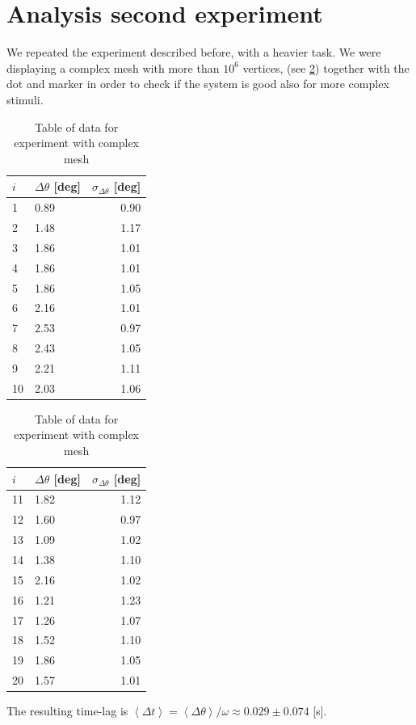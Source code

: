 \documentclass[a4paper]{article}  %
\begin{document}
\section{Analysis second experiment}
We repeated the experiment described before, with a heavier task. We were displaying a complex mesh with more than $10^6$ vertices, (see \ref{tab:table_exp2}) together with the dot and marker in order to check if the system is good also for more complex stimuli.

\begin{table}[htb!]\label{tab:table_exp2}
\centering
\begin{tabular}{|l|l|r|} \hline
$i$ & $\Delta \theta$ [deg] & $\sigma_{\Delta \theta}$ [deg]\\
\hline 
1 & 0.89 & 0.90 \\ \hline
2 & 1.48 & 1.17 \\ \hline
3 & 1.86 & 1.01 \\ \hline
4 & 1.86 & 1.01 \\ \hline
5 & 1.86 & 1.05 \\ \hline
6 & 2.16 & 1.01 \\ \hline
7 & 2.53 & 0.97 \\ \hline
8 & 2.43 & 1.05 \\ \hline
9 & 2.21 & 1.11 \\ \hline
10 & 2.03 & 1.06 \\
\hline
\end{tabular}
\begin{tabular}{|l|l|r|} \hline
$i$ & $\Delta \theta$ [deg] & $\sigma_{\Delta \theta}$ [deg]\\
\hline 
11 & 1.82 & 1.12 \\ \hline
12 & 1.60 & 0.97 \\ \hline
13 & 1.09 & 1.02 \\ \hline
14 & 1.38 & 1.10 \\ \hline
15 & 2.16 & 1.02 \\ \hline
16 & 1.21 & 1.23 \\ \hline
17 & 1.26 & 1.07 \\ \hline
18 & 1.52 & 1.10 \\ \hline
19 & 1.86 & 1.05 \\ \hline
20 & 1.57 & 1.01 \\
\hline
\end{tabular}
\caption{Table of data for experiment with complex mesh}
\end{table}

The resulting time-lag is $\left < \Delta t \right > = \left < \Delta \theta \right >/\omega \approx 0.029 \pm  0.074 $ [s].
\end{document}
